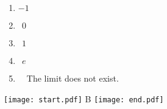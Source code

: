 \documentclass[12pt]{article}
\begin{document}
\begin{enumerate}
\begin{enumerate}

\item $-1$

\item $\ \ 0$

\item $\ \ 1$

\item $\ \ e$

\item \ \ The limit does not exist.

\end{enumerate}

\texttt{[image: start.pdf]}
{{B}}
\texttt{[image: end.pdf]}


\end{enumerate}
\end{document}
